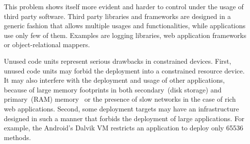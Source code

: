 This problem shows itself more evident and harder to control under the usage of third party software. 
Third party libraries and frameworks are designed in a generic fashion that allows multiple usages and functionalities, while applications use only few of them. 
Examples are logging libraries, web application frameworks or object-relational mappers.


%
%

Unused code units represent serious drawbacks in constrained devices. 
First, unused code units may forbid the deployment into a constrained resource device.
It may also interfere with the deployment and usage of other applications, because of large memory footprints in both secondary~(disk storage) and primary~(RAM) memory~\cite{Mart12a} or the presence of slow networks in the case of rich web applications.
Second, some deployment targets may have an infrastructure designed in such a manner that forbids the deployment of large applications. For example, the Android's Dalvik VM restricts an application to deploy only 65536 methods.


